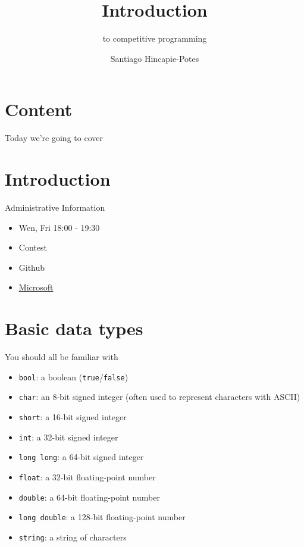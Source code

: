 \documentclass{beamer}
\title{Introduction}
\subtitle{to competitive programming}
\author{Santiago Hincapie-Potes}
\institute{Universidad EAFIT}
\date{\displaydate{date}}
\begin{document}
\maketitle

\section*{Content}
\begin{frame}{Today we're going to cover}
  \tableofcontents[hideallsubsections]
\end{frame}

\section{Introduction}
\begin{frame}{Administrative Information}
  \begin{itemize}
  \item Wen, Fri 18:00 - 19:30
  \item Contest
  \item Github
  \item \href{http://aka.ms/MSTT_EAFIT}{Microsoft}
  \end{itemize}
\end{frame}

\section{Basic data types}
\begin{frame}{You should all be familiar with}
  \begin{itemize}
  \item \texttt{bool}: a boolean (\texttt{true}/\texttt{false})
  \item \texttt{char}: an 8-bit signed integer (often used to represent characters with ASCII)
  \item \texttt{short}: a 16-bit signed integer
  \item \texttt{int}: a 32-bit signed integer
  \item \texttt{long long}: a 64-bit signed integer
  \item \texttt{float}: a 32-bit floating-point number
  \item \texttt{double}: a 64-bit floating-point number
  \item \texttt{long double}: a 128-bit floating-point number
  \item \texttt{string}: a string of characters
  \end{itemize}
\end{frame}
\end{document}
